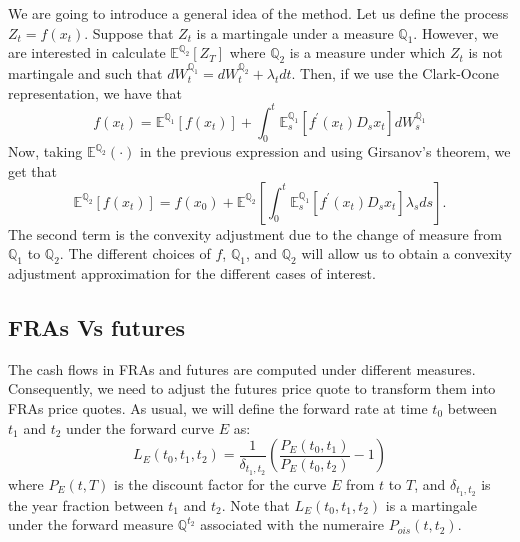 \documentclass[a4paper,10pt]{article}
\newcommand{\1}{\mathbf{1}}
\begin{document}
We are going to introduce a general idea of the method. Let us define the process $Z_t = f(x_t)$. Suppose that $Z_t$ is a martingale under a measure $\mathbb{Q}_1$. However, we are interested in calculate $\mathbb{E}^{\mathbb{Q}_2}\left[Z_T \right]$ where $\mathbb{Q}_2$ is a measure under which $Z_t$ is not martingale and such that $dW^{\mathbb{Q}_1}_t = dW^{\mathbb{Q}_2}_t +\lambda_t dt$. Then, if we use the Clark-Ocone representation, we have that
\begin{equation*}
f(x_t) = \mathbb{E}^{\mathbb{Q}_1}\left[f(x_t)\right] + \int_{0}^{t} \mathbb{E}^{\mathbb{Q}_1}_s\left[ f^{\prime}(x_t) D_s x_t  \right] dW^{\mathbb{Q}_1}_s
\end{equation*}
Now, taking $\mathbb{E}^{\mathbb{Q}_2}\left( \cdot \right)$ in the previous expression and using Girsanov's theorem, we get that
\begin{equation}\label{general_convexity}
\mathbb{E}^{\mathbb{Q}_2}\left[ f(x_t) \right] = f(x_0) + \mathbb{E}^{\mathbb{Q}_2} \left[\int_{0}^{t}  \mathbb{E}^{\mathbb{Q}_1}_s\left[ f^{\prime}(x_t) D_s x_t  \right] \lambda_s ds \right]. 
\end{equation}
The second term is the convexity adjustment due to the change of measure from $\mathbb{Q}_1$ to $\mathbb{Q}_2$. The different choices of $f$, $\mathbb{Q}_1$, and $\mathbb{Q}_2$ will allow us to obtain a convexity adjustment approximation for the different cases of interest. 
\subsection{FRAs Vs futures}
 The cash flows in FRAs and futures are computed under different measures. Consequently, we need to adjust the futures price quote to transform them into FRAs price quotes. As usual, we will define the forward rate at time $t_0$ between $t_1$ and $t_2$ under the forward curve $E$ as:
\begin{equation}\label{forward_rate}
L_{E}(t_0, t_1, t_2) = \frac{1}{\delta_{t_1,t_2}}\left(\frac{P_{E}(t_0,t_1)}{P_{E}(t_0,t_2)} - 1 \right)
\end{equation} 
where $P_{E}(t,T)$ is the discount factor for the curve $E$ from $t$ to $T$, and $\delta_{t_1,t_2}$ is the year fraction between $t_1$ and $t_2$. Note that $L_{E}(t_0, t_1, t_2)$ is a martingale under the forward measure $\mathbb{Q}^{t_2}$ associated with the numeraire $P_{ois}(t,t_2)$.
\end{document}
